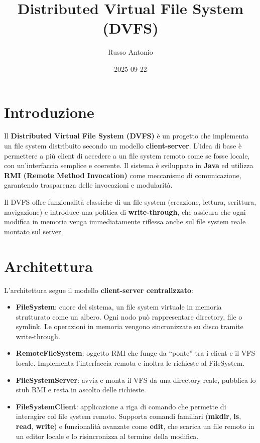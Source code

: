 \documentclass[11pt]{article}
\author{Russo Antonio}
\date{2025-09-22}
\title{Distributed Virtual File System (DVFS)}
\begin{document}
\maketitle
\tableofcontents

\section{Introduzione}
\label{sec:org0fc3aaa}
Il \textbf{Distributed Virtual File System (DVFS)} è un progetto che implementa un file system distribuito secondo un modello \textbf{client-server}.  
L’idea di base è permettere a più client di accedere a un file system remoto come se fosse locale, con un’interfaccia semplice e coerente.  
Il sistema è sviluppato in \textbf{Java} ed utilizza \textbf{RMI (Remote Method Invocation)} come meccanismo di comunicazione, garantendo trasparenza delle invocazioni e modularità.  

Il DVFS offre funzionalità classiche di un file system (creazione, lettura, scrittura, navigazione) e introduce una politica di \textbf{write-through}, che assicura che ogni modifica in memoria venga immediatamente riflessa anche sul file system reale montato sul server.  
\section{Architettura}
\label{sec:org1315a3c}
L’architettura segue il modello \textbf{client-server centralizzato}:

\begin{itemize}
\item \textbf{FileSystem}: cuore del sistema, un file system virtuale in memoria strutturato come un albero. Ogni nodo può rappresentare directory, file o symlink. Le operazioni in memoria vengono sincronizzate su disco tramite write-through.
\item \textbf{RemoteFileSystem}: oggetto RMI che funge da “ponte” tra i client e il VFS locale. Implementa l’interfaccia remota e inoltra le richieste al FileSystem.
\item \textbf{FileSystemServer}: avvia e monta il VFS da una directory reale, pubblica lo stub RMI e resta in ascolto delle richieste.
\item \textbf{FileSystemClient}: applicazione a riga di comando che permette di interagire col file system remoto. Supporta comandi familiari (\textbf{mkdir}, \textbf{ls}, \textbf{read}, \textbf{write}) e funzionalità avanzate come \textbf{edit}, che scarica un file remoto in un editor locale e lo risincronizza al termine della modifica.
\end{itemize}
\end{document}
